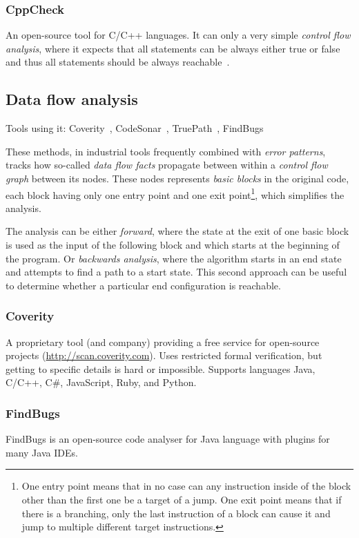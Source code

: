 \subsubsection{CppCheck}
An open-source tool for C/C++ languages. It can only a very simple {\em control flow analysis}, where it expects that all statements can be always either true or false and thus all statements should be always reachable~\cite{cppcheckDesign}.

\subsection{Data flow analysis}
Tools using it: Coverity~\cite{KrenaVojnarOverview}, CodeSonar~\cite{KrenaVojnarOverview}, TruePath~\cite{KrenaVojnarOverview}, FindBugs~\cite{KrenaVojnarOverview}

These methods, in industrial tools frequently combined with {\em error patterns}, tracks how so-called {\em data flow facts} propagate between within a {\em control flow graph} between its nodes. These nodes represents {\em basic blocks} in the original code, each block having only one entry point and one exit point\footnote{One entry point means that in no case can any instruction inside of the block other than the first one be a target of a jump. One exit point means that if there is a branching, only the last instruction of a block can cause it and jump to multiple different target instructions.}, which simplifies the analysis.

The analysis can be either {\em forward}, where the state at the exit of one basic block is used as the input of the following block and which starts at the beginning of the program. Or {\em backwards analysis}, where the algorithm starts in an end state and attempts to find a path to a start state. This second approach can be useful to determine whether a particular end configuration is reachable.

\subsubsection{Coverity}
A proprietary tool (and company) providing a free service for open-source projects (\url{http://scan.coverity.com}). Uses restricted formal verification, but getting to specific details is hard or impossible. Supports languages Java, C/C++, C\#, JavaScript, Ruby, and Python.

\subsubsection{FindBugs}
FindBugs is an open-source code analyser for Java language with plugins for many Java IDEs.


